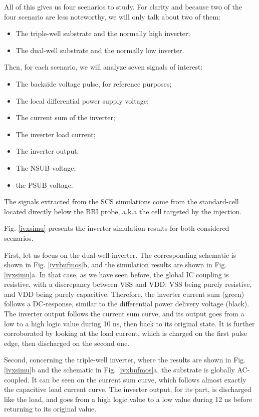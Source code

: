 	All of this gives us four scenarios	 to study.
	For clarity and because two of the four scenario are less noteworthy, we will only talk about two of them:
	\begin{itemize}
		\item The triple-well substrate and the normally high inverter;
		\item The dual-well substrate and the normally low inverter.
	\end{itemize}
	Then, for each scenario, we will analyze seven signals of interest:
	\begin{itemize}
		\item The backside voltage pulse, for reference purposes;
		\item The local differential power supply voltage;
		\item The current sum of the inverter;
		\item The inverter load current;
		\item The inverter output;
		\item The NSUB voltage;
		\item the PSUB voltage.
	\end{itemize}
	The signals extracted from the SCS simulations come from the standard-cell located directly below the BBI probe, a.k.a the cell targeted by the injection.
	
	Fig. \ref{ivxsimu} presents the inverter simulation results for both considered scenarios.

	First, let us focus on the dual-well inverter.
	The corresponding schematic is shown in Fig. \ref{ivxbufmos}b, and the simulation results are shown in Fig. \ref{ivxsimu}a.
	In that case, as we have seen before, the global IC coupling is resistive, with a discrepancy between VSS and VDD: VSS being purely resistive, and VDD being purely capacitive.
	Therefore, the inverter current sum (green) follows a DC-response, similar to the differential power delivery voltage (black).
	The inverter output follows the current sum curve, and its output goes from a low to a high logic value during 10 ns, then back to its original state.
	It is further corroborated by looking at the load current, which is charged on the first pulse edge, then discharged on the second one.

	Second, concerning the triple-well inverter, where the results are shown in Fig. \ref{ivxsimu}b and the schematic in Fig. \ref{ivxbufmos}a, the substrate is globally AC-coupled.
	It can be seen on the current sum curve, which follows almost exactly the capacitive load current curve.
	The inverter output, for its part, is discharged like the load, and goes from a high logic value to a low value during 12 ns before returning to its original value.

